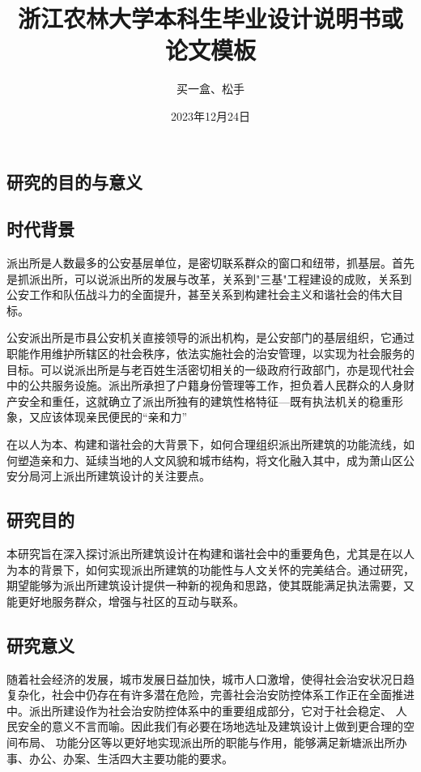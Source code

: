 \documentclass[AutoFakeBold]{ZafuResearchProposal}
\author{买一盒、松手}%
\date{2023年12月24日}%
\title{{浙江农林大学本科生}{毕业设计说明书或论文模板}}%
\begin{document}
\proposalCover

\mainmatter

\begin{RPSectionBox}
    \section{研究的目的与意义}
    \subsection{时代背景}    
    派出所是人数最多的公安基层单位，是密切联系群众的窗口和纽带，抓基层。首先是抓派出所，可以说派出所的发展与改革，关系到"三基"工程建设的成败，关系到公安工作和队伍战斗力的全面提升，甚至关系到构建社会主义和谐社会的伟大目标。\par
    公安派出所是市县公安机关直接领导的派出机构，是公安部门的基层组织，它通过职能作用维护所辖区的社会秩序，依法实施社会的治安管理，以实现为社会服务的目标。可以说派出所是与老百姓生活密切相关的一级政府行政部门，亦是现代社会中的公共服务设施。派出所承担了户籍身份管理等工作，担负着人民群众的人身财产安全和重任，这就确立了派出所独有的建筑性格特征---既有执法机关的稳重形象，又应该体现亲民便民的``亲和力''\par
    在以人为本、构建和谐社会的大背景下，如何合理组织派出所建筑的功能流线，如何塑造亲和力、延续当地的人文风貌和城市结构，将文化融入其中，成为萧山区公安分局河上派出所建筑设计的关注要点。
    \subsection{研究目的}
    本研究旨在深入探讨派出所建筑设计在构建和谐社会中的重要角色，尤其是在以人为本的背景下，如何实现派出所建筑的功能性与人文关怀的完美结合。通过研究，期望能够为派出所建筑设计提供一种新的视角和思路，使其既能满足执法需要，又能更好地服务群众，增强与社区的互动与联系。
    \subsection{研究意义}
    随着社会经济的发展，城市发展日益加快，城市人口激增，使得社会治安状况日趋复杂化，社会中仍存在有许多潜在危险，完善社会治安防控体系工作正在全面推进中。派出所建设作为社会治安防控体系中的重要组成部分，它对于社会稳定、 人民安全的意义不言而喻。因此我们有必要在场地选址及建筑设计上做到更合理的空间布局、 功能分区等以更好地实现派出所的职能与作用，能够满足新塘派出所办事、办公、办案、生活四大主要功能的要求。

\end{RPSectionBox}
\end{document}
